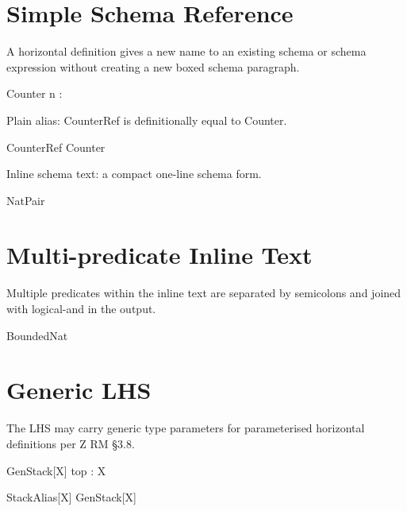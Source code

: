 \documentclass[a4paper,10pt,fleqn]{article}
\begin{document}
\section*{Simple Schema Reference}

\noindent A horizontal definition gives a new name to an existing schema or schema expression without creating a new boxed schema paragraph.

\bigskip

\begin{schema}{Counter}
n : \nat
\end{schema}

\noindent Plain alias: CounterRef is definitionally equal to Counter.

\bigskip

\begin{zed}
CounterRef  Counter
\end{zed}

\noindent Inline schema text: a compact one-line schema form.

\bigskip

\begin{zed}
NatPair 
\end{zed}

\section*{Multi-predicate Inline Text}

\noindent Multiple predicates within the inline text are separated by semicolons and joined with logical-and in the output.

\bigskip

\begin{zed}
BoundedNat 
\end{zed}

\section*{Generic LHS}

\noindent The LHS may carry generic type parameters for parameterised horizontal definitions per Z RM §3.8.

\bigskip

\begin{schema}{GenStack}[X]
top : X
\end{schema}

\begin{zed}
StackAlias[X]  GenStack[X]
\end{zed}
\end{document}
